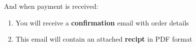 \documentclass[11pt, english]{article}
\begin{document}
And when payment is received:

	\begin{enumerate}
        \setlength\itemsep{0cm}
		\item You will receive a \textbf{confirmation} email with order details
		\item This email will contain an attached \textbf{recipt} in PDF format
	\end{enumerate}
\end{document}
